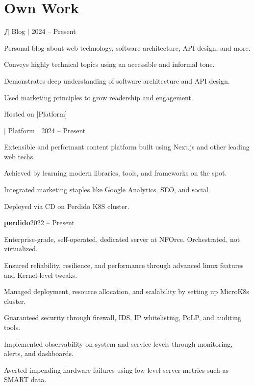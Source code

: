 \documentclass[a4paper,11pt]{article}
\begin{document}
\section{Own Work}
\begin{sectionList}
    \begin{project}{\textbf{\gregrosdev} $f|$ Blog $|$ \https{\mywebsite}}{2024 -- Present}
        \item Personal blog about web technology, software architecture, API design, and more.
        \item Conveys highly technical topics using an accessible and informal tone.
        \item Demonstrates deep understanding of software architecture and API design.
        \item Used marketing principles to grow readership and engagement.
        \item Hosted on [Platform]
    \end{project}
    \begin{project}{\textbf{\gregrosdev} $|$ Platform $|$ \https{\mywebsite}}{2024 -- Present}
        \item Extensible and performant content platform built using Next.js and other leading web techs.
        \item Achieved by learning modern libraries, tools, and frameworks on the spot.
        \item Integrated marketing staples like Google Analytics, SEO, and social.
        \item Deployed via CD on Perdido K8S cluster.
    \end{project}    
    \begin{project}{\textbf{perdido}}{2022 -- Present}
        \item Enterprise-grade, self-operated, dedicated server at NFOrce. Orchestrated, not virtualized.
        \item Ensured reliability, resilience, and performance through advanced linux features and Kernel-level tweaks.
        \item Managed deployment, resource allocation, and scalability by setting up MicroK8s cluster.
        \item Guaranteed security through firewall, IDS, IP whitelisting, PoLP, and auditing tools.    
        \item Implemented observability on system and service levels through monitoring, alerts, and dashboards.
        \item Averted impending hardware failures using low-level server metrics such as SMART data.
    \end{project}
\end{sectionList}
\end{document}
